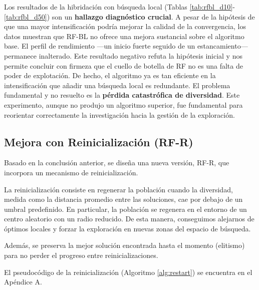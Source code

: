 \documentclass[11pt,a4paper]{article}
\begin{document}
Los resultados de la hibridación con búsqueda local (Tablas \ref{tab:rfbl_d10}-\ref{tab:rfbl_d50}) son un \textbf{hallazgo diagnóstico crucial}. A pesar de la hipótesis de que una mayor intensificación podría mejorar la calidad de la convergencia, los datos muestran que RF-BL no ofrece una mejora sustancial sobre el algoritmo base. El perfil de rendimiento —un inicio fuerte seguido de un estancamiento— permanece inalterado. Este resultado negativo refuta la hipótesis inicial y nos permite concluir con firmeza que el cuello de botella de RF no es una falta de poder de explotación. De hecho, el algoritmo ya es tan eficiente en la intensificación que añadir una búsqueda local es redundante. El problema fundamental y no resuelto es la \textbf{pérdida catastrófica de diversidad}. Este experimento, aunque no produjo un algoritmo superior, fue fundamental para reorientar correctamente la investigación hacia la gestión de la exploración.

\subsection{Mejora con Reinicialización (RF-R)}
Basado en la conclusión anterior, se diseña una nueva versión, 
RF-R, que incorpora un mecanismo de reinicialización. 

La reinicialización consiste en regenerar la población cuando 
la diversidad, medida como la distancia promedio entre las soluciones,
cae por debajo de un umbral predefinido. En particular, la población se regenera 
en el entorno de un centro aleatorio con un radio reducido. De esta manera, conseguimos 
alejarnos de óptimos locales y forzar la exploración en nuevas zonas del espacio de búsqueda.

Además, se preserva la mejor solución encontrada hasta el momento (elitismo) para no perder el progreso entre reinicializaciones.

El pseudocódigo de la reinicialización (Algoritmo \ref{alg:restart}) se encuentra en el Apéndice A.
\end{document}
